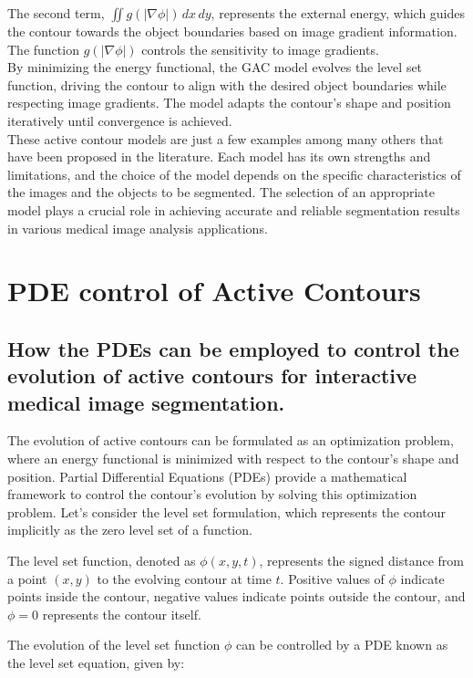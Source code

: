 \documentclass[]{report}
\begin{document}
The second term, $\iint g(\lvert \nabla\phi \rvert) \, dx \, dy$, represents the external energy, which guides the contour towards the object boundaries based on image gradient information. The function $g(\lvert \nabla\phi \rvert)$ controls the sensitivity to image gradients.\\

By minimizing the energy functional, the GAC model evolves the level set function, driving the contour to align with the desired object boundaries while respecting image gradients. The model adapts the contour's shape and position iteratively until convergence is achieved.\\

These active contour models are just a few examples among many others that have been proposed in the literature. Each model has its own strengths and limitations, and the choice of the model depends on the specific characteristics of the images and the objects to be segmented. The selection of an appropriate model plays a crucial role in achieving accurate and reliable segmentation results in various medical image analysis applications.\\
\chapter*{PDE control of Active Contours}

\section*{How the PDEs can be employed to control the evolution of active contours for interactive medical image segmentation.}
The evolution of active contours can be formulated as an optimization problem, where an energy functional is minimized with respect to the contour's shape and position. Partial Differential Equations (PDEs) provide a mathematical framework to control the contour's evolution by solving this optimization problem. Let's consider the level set formulation, which represents the contour implicitly as the zero level set of a function.

The level set function, denoted as $\phi(x, y, t)$, represents the signed distance from a point $(x, y)$ to the evolving contour at time $t$. Positive values of $\phi$ indicate points inside the contour, negative values indicate points outside the contour, and $\phi = 0$ represents the contour itself.

The evolution of the level set function $\phi$ can be controlled by a PDE known as the level set equation, given by:
\end{document}
